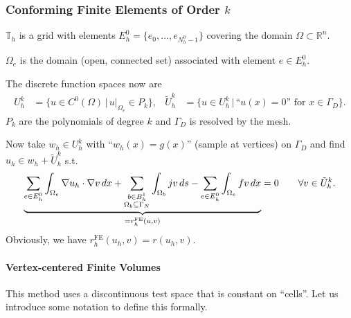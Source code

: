\begin{frame}
\frametitle<presentation>{Conforming Finite Elements of Order $k$}
$\mathbb{T}_h$ is a grid with elements
$E_h^0=\{e_0,\ldots,e_{N_h^0-1}\}$
covering the domain $\Omega\subset\mathbb{R}^n$.

$\Omega_e$ is the domain (open, connected set) associated with element
$e\in E_h^0$.

The discrete function spaces now are
\begin{align*}
U_h^k &= \{u\in C^0(\Omega) \,|\, u|_{\Omega_e}\in P_k
\}, &
\tilde{U}_h^k &= \{u \in U_h^k \,|\, \text{``$u(x) = 0$'' for $x\in\Gamma_D$}\}.
\end{align*}
$P_k$ are the polynomials of degree $k$ and $\Gamma_D$ is resolved
by the mesh.

Now take $w_h\in U_h^k$ with ``$w_h(x) = g(x)$'' (sample at vertices)
on $\Gamma_D$ and find $u_h\in w_h+\tilde{U}_h^k$ s.t.  
\begin{equation}
\underbrace{\sum_{e\in E_h^0}\int_{\Omega_e} \nabla u_h \cdot \nabla v \,d x
 + \sum_{\substack{b\in B^1_h\\ \Omega_b\subseteq\Gamma_N}} 
\int_{\Omega_b} j v \,d s - \sum_{e\in E_h^0} \int_{\Omega_e} f v \,dx}_{= r^\text{FE}_h(u,v)}
 = 0 \qquad \forall v\in \tilde{U}^k_h.
\end{equation}
Obviously, we have $r^\text{FE}_h(u_h,v) = r(u_h,v)$.
\end{frame}

\paragraph{Vertex-centered Finite Volumes}

This method uses a discontinuous test space that is constant on
``cells''. Let us introduce some notation to define this formally.

